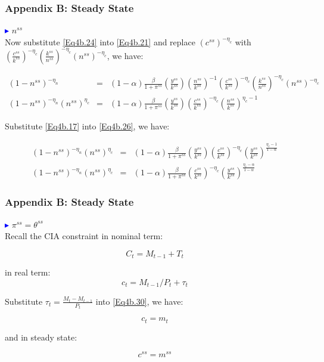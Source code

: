 \begin{frame}
\frametitle{Appendix B: Steady State} \vskip 0.1in

\textcolor{blue}{$\blacktriangleright$}  $n^{ss}$\\

Now substitute \eqref{Eq4b.24} into \eqref{Eq4b.21} and replace
$(c^{ss})^{-\eta_{c}}$ with $(\frac{c^{ss}}{k^{ss}})^{-\eta_{c}}
(\frac{k^{ss}}{n^{ss}})^{-\eta_{c}} (n^{ss})^{-\eta_{c}}$, we have:

{\scriptsize{
\begin{eqnarray}
(1-n^{ss})^{-\eta_{n}} &=& (1-\alpha) \frac{\beta}{1+\pi^{ss}}
(\frac{y^{ss}}{k^{ss}}) (\frac{n^{ss}}{k^{ss}})^{-1}
(\frac{c^{ss}}{k^{ss}})^{-\eta_{c}}
(\frac{k^{ss}}{n^{ss}})^{-\eta_{c}}
(n^{ss})^{-\eta_{c}} ~~~ ~~~ ~~~\label{Eq4b.25}\\
(1-n^{ss})^{-\eta_{n}} (n^{ss})^{\eta_{c}} &=& (1-\alpha)
\frac{\beta}{1+\pi^{ss}} (\frac{y^{ss}}{k^{ss}})
(\frac{c^{ss}}{k^{ss}})^{-\eta_{c}}
(\frac{n^{ss}}{k^{ss}})^{\eta_{c}-1} \label{Eq4b.26}
\end{eqnarray}
}}

Substitute \eqref{Eq4b.17} into \eqref{Eq4b.26}, we have:

{\scriptsize{
\begin{eqnarray}
(1-n^{ss})^{-\eta_{n}} (n^{ss})^{\eta_{c}} &=& (1-\alpha)
\frac{\beta}{1+\pi^{ss}} (\frac{y^{ss}}{k^{ss}})
(\frac{c^{ss}}{k^{ss}})^{-\eta_{c}}
(\frac{y^{ss}}{k^{ss}})^{\frac{\eta_{c}-1}{1-\alpha}} \label{Eq4b.27}\\
(1-n^{ss})^{-\eta_{n}} (n^{ss})^{\eta_{c}} &=& (1-\alpha)
\frac{\beta}{1+\pi^{ss}} (\frac{c^{ss}}{k^{ss}})^{-\eta_{c}}
(\frac{y^{ss}}{k^{ss}})^{\frac{\eta_{c}-\alpha}{1-\alpha}}
\label{Eq4b.28}
\end{eqnarray}
}}

\end{frame}

\begin{frame}
\frametitle{Appendix B: Steady State} \vskip 0.1in

\textcolor{blue}{$\blacktriangleright$}  $\pi^{ss}=\theta^{ss}$\\

Recall the CIA constraint in nominal term:

\begin{equation}\label{Eq4b.29}
C_{t}=M_{t-1}+T_{t}
\end{equation}

in real term:
\begin{equation}\label{Eq4b.30}
c_{t}=M_{t-1}/P_{t}+\tau_{t}
\end{equation}

Substitute $\tau_{t}=\frac{M_{t}-M_{t-1}}{P_{t}}$ into
\eqref{Eq4b.30}, we have:

\begin{equation}\label{Eq4b.31}
c_{t}=m_{t}
\end{equation}

and in steady state:

\begin{equation}\label{Eq4b.32}
c^{ss}=m^{ss}
\end{equation}

\end{frame}
